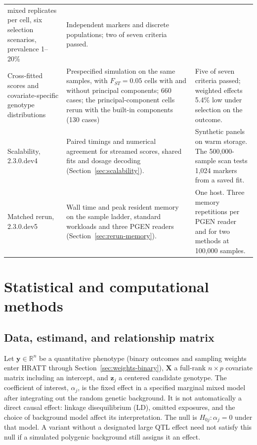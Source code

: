 \documentclass[11pt]{article}
\newcommand{\y}{\mathbf{y}}
\newcommand{\z}{\mathbf{z}}
\newcommand{\X}{\mathbf{X}}
\begin{document}
\begin{table}[htbp]
\begin{tabularx}{\textwidth}{@{}>{\raggedright\arraybackslash}p{}>{\raggedright\arraybackslash}X>{\raggedright\arraybackslash}X@{}}
mixed replicates per cell, six selection scenarios, prevalence 1--20\% &
Independent markers and discrete populations;
two of seven criteria passed. \\
Cross-fitted scores and covariate-specific genotype distributions &
Prespecified simulation on the same samples, with $F_{ST}=0.05$ cells with
and without principal components; 660 cases; the principal-component cells
rerun with the built-in components (130 cases) & Five of seven criteria
passed; weighted effects 5.4\% low under selection on the outcome. \\
Scalability, 2.3.0.dev4 & Paired timings and numerical agreement for
streamed scores, shared fits and dosage decoding
(Section~\ref{sec:scalability}). & Synthetic panels on warm storage.
The 500,000-sample scan tests 1,024 markers from a saved fit. \\
Matched rerun, 2.3.0.dev5 & Wall time and peak resident memory on the
sample ladder, standard workloads and three PGEN readers
(Section~\ref{sec:rerun-memory}). & One host. Three memory repetitions
per PGEN reader and for two methods at 100,000 samples. \\
\bottomrule
\end{tabularx}
\end{table}

\section{Statistical and computational methods}
\label{sec:methods}

\subsection{Data, estimand, and relationship matrix}

Let $\y\in\mathbb{R}^n$ be a quantitative phenotype (binary outcomes and
sampling weights enter HRATT through Section~\ref{sec:weights-binary}), $\X$ a full-rank
$n\times p$ covariate matrix including an intercept, and $\z_j$ a
centered candidate genotype. The coefficient of interest, $\alpha_j$,
is the fixed effect in a specified marginal mixed model after integrating
out the random genetic background. It is not automatically a direct
causal effect: linkage disequilibrium (LD), omitted exposures, and the
choice of background model affect its interpretation. The null is
$H_{0j}:\alpha_j=0$ under that model. A variant without a designated
large QTL effect need not satisfy this null if a simulated polygenic
background still assigns it an effect.
\end{document}
